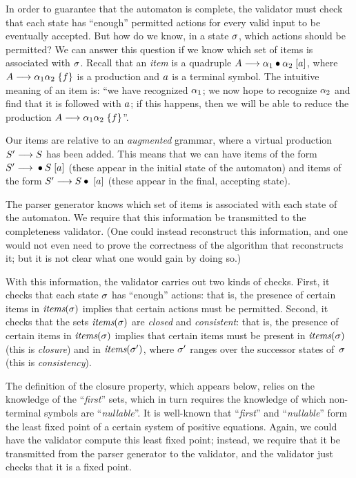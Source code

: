 \documentclass{llncs}
\begin{document}

In order to guarantee that the automaton is complete, the validator must check
that each state has ``enough'' permitted actions for every valid input to be
eventually accepted. But how do we know, in a state $\sigma$, which actions
should be permitted? We can answer this question if we know which set
of \lrone items is associated with $\sigma$.
%
Recall that an \emph{item} is a quadruple
$A\longrightarrow\alpha_1{}\bullet{}\alpha_2\;[a]$, where
$A\longrightarrow\alpha_1\alpha_2\;\{f\}$ is a production and $a$ is a
terminal symbol.
%
%
The intuitive meaning of an item is: ``we have recognized $\alpha_1$; we now
hope to recognize $\alpha_2$ and find that it is followed with $a$; if
this happens, then we will be able to reduce the production
$A\longrightarrow\alpha_1\alpha_2\;\{f\}$''.

Our items are relative to an \emph{augmented} grammar, where a virtual
production $S'\longrightarrow S$ has been added. This means that we can have items
of the form $S'\longrightarrow{}\bullet{}S\;[a]$ (these appear in the initial
state of the automaton) and items of the form $S'\longrightarrow S{}\bullet{}\;[a]$ (these
appear in the final, accepting state).

The parser generator knows which set of items is associated with each state of
the automaton. We require that this information be transmitted to the
completeness validator. (One could instead reconstruct this information, and
one would not even need to prove the correctness of the algorithm that
reconstructs it;
but it is not clear what one would gain by doing so.)

With this information, the validator carries out two kinds of checks. First,
it checks that each state $\sigma$ has ``enough'' actions: that is, the
presence of certain items in $\textit{items}(\sigma)$ implies that certain actions must
be permitted. Second, it checks that the sets $\textit{items}(\sigma)$ are \emph{closed}
and \emph{consistent}: that is, the presence of certain items in
$\textit{items}(\sigma)$ implies that certain items must be present in $\textit{items}(\sigma)$
(this is \emph{closure}) and in $\textit{items}(\sigma')$, where $\sigma'$ ranges over
the successor states of~$\sigma$ (this is \emph{consistency}).

The definition of the closure property, which appears below, relies on
the knowledge of the ``\textit{first}'' sets, which in turn requires the
knowledge of which non-terminal symbols are ``\textit{nullable}''. It is
well-known that ``\textit{first}'' and ``\textit{nullable}'' form the least
fixed point of a certain system of positive equations. Again, we could have
the validator compute this least fixed point; instead, we require that it be
transmitted from the parser generator to the validator, and the validator just
checks that it is a fixed point.
\end{document}
